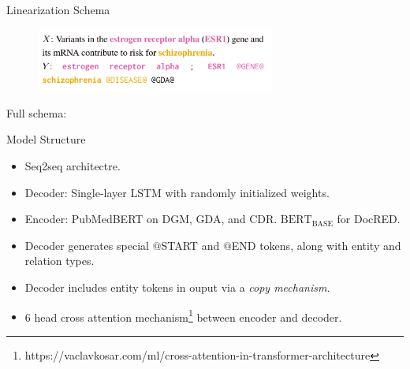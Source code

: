\documentclass[usenames,dvipsnames,pdf]{beamer}
\begin{document}
        \begin{frame}{Linearization Schema}
          \begin{figure}
          \includegraphics[width=0.7\textwidth,height=0.7\textheight,keepaspectratio]{linearization} 
          \end{figure}
          Full schema:

          
          \begin{adjustbox}{varwidth=\linewidth}%
            \small{}


            \small{}


            \small{}
            \end{adjustbox}
        \end{frame}

        \begin{frame}{Model Structure}
          \begin{itemize}
          \item
            Seq2seq architectre.
          \item
            Decoder: Single-layer LSTM with randomly initialized weights.
          \item
            Encoder: PubMedBERT on DGM, GDA, and CDR.  $\text{BERT}_{\text{BASE}}$ for DocRED.
          \item
            Decoder generates special $@$START and $@$END tokens, along with entity and relation types.
          \item
            Decoder includes entity tokens in ouput via a \textit{copy mechanism}.
          \item
            6 head cross attention mechanism\footnote{https://vaclavkosar.com/ml/cross-attention-in-transformer-architecture} between encoder and decoder.
          \end{itemize}
        \end{frame}
\end{document}
